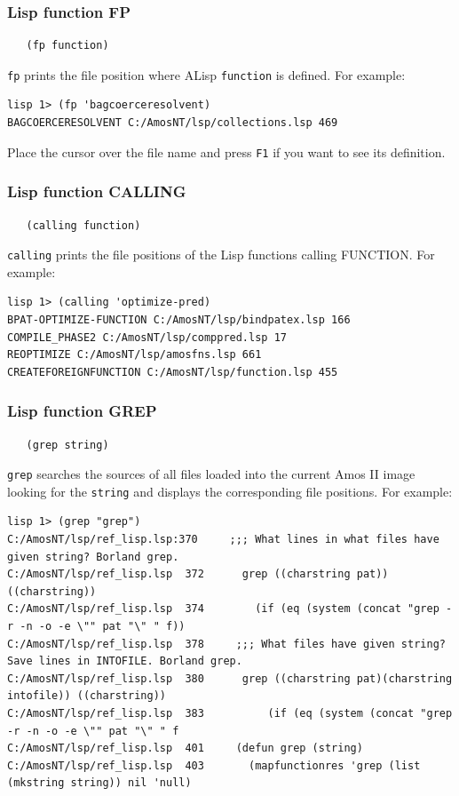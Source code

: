 \subsubsection*{Lisp function FP}

\begin{verbatim}
   (fp function)
\end{verbatim}
{\tt fp} prints the file position where ALisp {\tt function} is
defined. For example:
\begin{verbatim}
lisp 1> (fp 'bagcoerceresolvent)
BAGCOERCERESOLVENT C:/AmosNT/lsp/collections.lsp 469
\end{verbatim}
Place the cursor over the file name and press {\tt F1} if you want to
see its definition.

\subsubsection*{Lisp function CALLING}

\begin{verbatim}
   (calling function)
\end{verbatim}
{\tt calling} prints the file positions of the Lisp functions calling
FUNCTION. For example:
\begin{verbatim}
lisp 1> (calling 'optimize-pred)
BPAT-OPTIMIZE-FUNCTION C:/AmosNT/lsp/bindpatex.lsp 166
COMPILE_PHASE2 C:/AmosNT/lsp/comppred.lsp 17
REOPTIMIZE C:/AmosNT/lsp/amosfns.lsp 661
CREATEFOREIGNFUNCTION C:/AmosNT/lsp/function.lsp 455
\end{verbatim}


\subsubsection*{Lisp function GREP}

\begin{verbatim}
   (grep string)
\end{verbatim}
{\tt grep} searches the sources of all files loaded into the current
Amos II image looking for the {\tt string} and displays the
corresponding file positions. For example:
\begin{verbatim}
lisp 1> (grep "grep")
C:/AmosNT/lsp/ref_lisp.lsp:370     ;;; What lines in what files have given string? Borland grep.
C:/AmosNT/lsp/ref_lisp.lsp  372      grep ((charstring pat)) ((charstring))
C:/AmosNT/lsp/ref_lisp.lsp  374        (if (eq (system (concat "grep -r -n -o -e \"" pat "\" " f))
C:/AmosNT/lsp/ref_lisp.lsp  378     ;;; What files have given string? Save lines in INTOFILE. Borland grep.
C:/AmosNT/lsp/ref_lisp.lsp  380      grep ((charstring pat)(charstring intofile)) ((charstring))
C:/AmosNT/lsp/ref_lisp.lsp  383          (if (eq (system (concat "grep -r -n -o -e \"" pat "\" " f 
C:/AmosNT/lsp/ref_lisp.lsp  401     (defun grep (string)
C:/AmosNT/lsp/ref_lisp.lsp  403       (mapfunctionres 'grep (list (mkstring string)) nil 'null)     
\end{verbatim}

